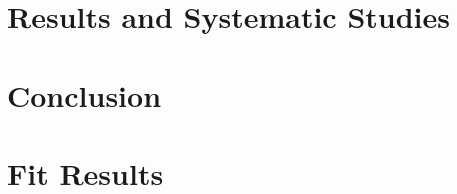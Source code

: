 \documentclass[final]{memoir}
\begin{document}
\chapter{Results and Systematic Studies}

\chapter{Conclusion}


\appendix
\chapter{Fit Results}


\backmatter
\printbibliography
\newpage
\end{document}
